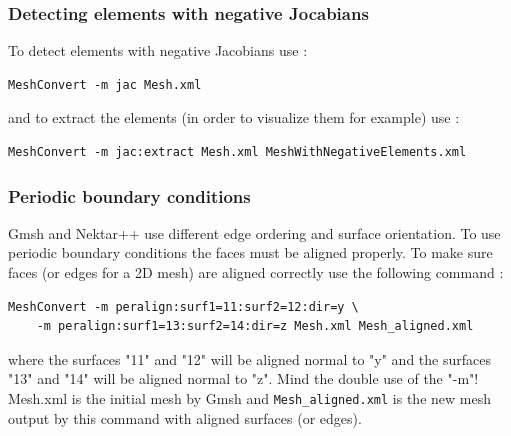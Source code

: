 \subsubsection{Detecting elements with negative Jocabians}
To detect elements with negative Jacobians use :
\begin{lstlisting}[style=BashInputStyle]
MeshConvert -m jac Mesh.xml
\end{lstlisting}
and to extract the elements (in order to visualize them for example) use :
\begin{lstlisting}[style=BashInputStyle]
MeshConvert -m jac:extract Mesh.xml MeshWithNegativeElements.xml
\end{lstlisting}
\subsubsection{Periodic boundary conditions}
Gmsh and Nektar++ use different edge ordering and surface orientation. To use periodic boundary conditions the faces must be aligned properly. To make sure faces (or edges for a 2D mesh) are aligned correctly use the following command :
\begin{lstlisting}[style=BashInputStyle]
MeshConvert -m peralign:surf1=11:surf2=12:dir=y \
    -m peralign:surf1=13:surf2=14:dir=z Mesh.xml Mesh_aligned.xml
\end{lstlisting}
where the surfaces "11" and "12" will be aligned normal to "y" and the surfaces "13" and "14" will be aligned normal to "z". Mind the double use of the "-m"! Mesh.xml is the initial mesh by Gmsh and \verb+Mesh_aligned.xml+ is the new mesh output by this command with aligned surfaces (or edges).
